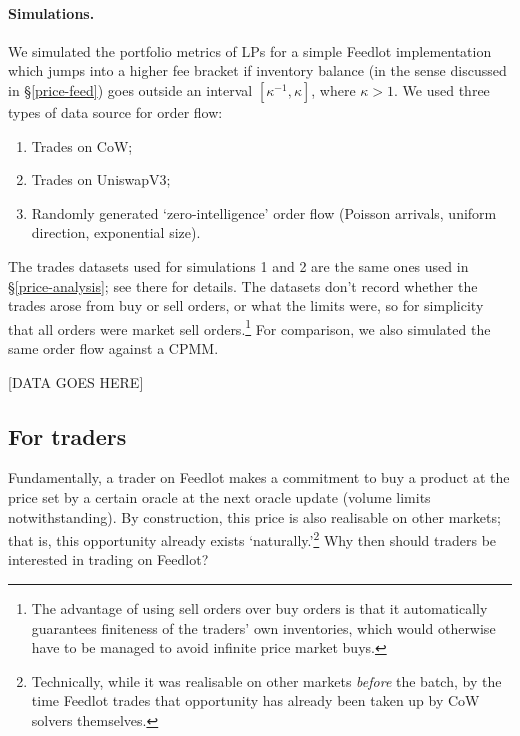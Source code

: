 \documentclass[a4paper,10pt]{article}
\theoremstyle{remark}
\begin{document}
\paragraph{Simulations.}

We simulated the portfolio metrics of LPs for a simple Feedlot implementation which jumps into a higher fee bracket if inventory balance (in the sense discussed in \S\ref{price-feed}) goes outside an interval $[\kappa^{-1},\kappa]$, where $\kappa>1$.
%
We used three types of data source for order flow:
\begin{enumerate}
  \item Trades on CoW;
  \item Trades on UniswapV3;
  \item Randomly generated `zero-intelligence' order flow (Poisson arrivals, uniform direction, exponential size).
\end{enumerate}
The trades datasets used for simulations 1 and 2 are the same ones used in \S\ref{price-analysis}; see there for details.
%
The datasets don't record whether the trades arose from buy or sell orders, or what the limits were, so for simplicity that all orders were market sell orders.\footnote{The advantage of using sell orders over buy orders is that it automatically guarantees finiteness of the traders' own inventories, which would otherwise have to be managed to avoid infinite price market buys.}
%
For comparison, we also simulated the same order flow against a CPMM.

[DATA GOES HERE]

\subsection{For traders}

Fundamentally, a trader on Feedlot makes a commitment to buy a product at the price set by a certain oracle at the next oracle update (volume limits notwithstanding).
%
By construction, this price is also realisable on other markets; that is, this opportunity already exists `naturally.'\footnote{Technically, while it was realisable on other markets \emph{before} the batch, by the time Feedlot trades that opportunity has already been taken up by CoW solvers themselves.}
%
Why then should traders be interested in trading on Feedlot?
\end{document}
